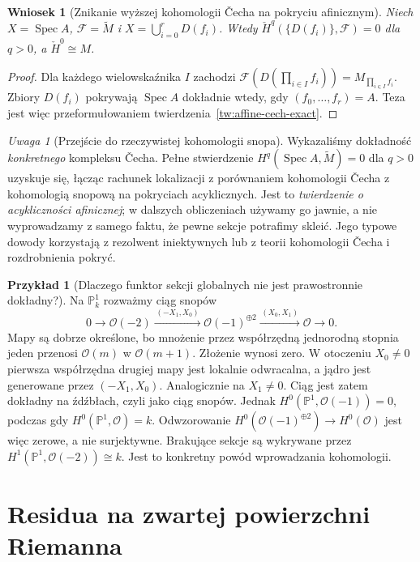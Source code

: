 \documentclass[11pt,a4paper,openany]{report}
\numberwithin{equation}{section}
\theoremstyle{plain}
\newtheorem{wniosek}[twierdzenie]{Wniosek}
\theoremstyle{definition}
\newtheorem{przyklad}[twierdzenie]{Przykład}
\theoremstyle{remark}
\newtheorem{uwaga}[twierdzenie]{Uwaga}
\newcommand{\PP}{\mathbb P}
\newcommand{\Spec}{\operatorname{Spec}}
\begin{document}
\begin{wniosek}[Znikanie wyższej kohomologii Čecha na pokryciu afinicznym]
Niech $X=\Spec A$, $\mathcal F=\widetilde M$ i
$X=\bigcup_{i=0}^rD(f_i)$. Wtedy
$\check H^q(\{D(f_i)\},\mathcal F)=0$ dla
$q>0$, a $\check H^0\cong M$.
\end{wniosek}
\begin{proof}
Dla każdego wielowskaźnika $I$ zachodzi
$\mathcal F(D(\prod_{i\in I}f_i))=M_{\prod_{i\in I}f_i}$.
Zbiory $D(f_i)$ pokrywają $\Spec A$ dokładnie wtedy,
gdy $(f_0,\ldots,f_r)=A$. Teza jest więc
przeformułowaniem twierdzenia~\ref{tw:affine-cech-exact}.
\end{proof}

\begin{uwaga}[Przejście do rzeczywistej kohomologii snopa]
Wykazaliśmy dokładność \emph{konkretnego} kompleksu
Čecha. Pełne stwierdzenie
$H^q(\Spec A,\widetilde M)=0$ dla $q>0$
uzyskuje się, łącząc rachunek lokalizacji z
porównaniem kohomologii Čecha z kohomologią
snopową na pokryciach acyklicznych. Jest to
\emph{twierdzenie o acykliczności afinicznej};
w dalszych obliczeniach używamy go jawnie,
a nie wyprowadzamy z samego faktu, że pewne sekcje
potrafimy skleić. Jego typowe dowody korzystają
z rezolwent iniektywnych lub z teorii kohomologii
Čecha i rozdrobnienia pokryć.
\end{uwaga}

\begin{przyklad}[Dlaczego funktor sekcji globalnych nie jest prawostronnie dokładny?]
Na $\PP^1_k$ rozważmy ciąg snopów
\[
0\longrightarrow\mathcal O(-2)
\xrightarrow{\,(-X_1,X_0)\,}\mathcal O(-1)^{\oplus2}
\xrightarrow{\,(X_0,X_1)\,}\mathcal O\longrightarrow0.
\]
Mapy są dobrze określone, bo mnożenie przez współrzędną
jednorodną stopnia jeden przenosi $\mathcal O(m)$ w
$\mathcal O(m+1)$. Złożenie wynosi zero.
W otoczeniu $X_0\ne0$ pierwsza współrzędna drugiej
mapy jest lokalnie odwracalna, a jądro jest generowane
przez $(-X_1,X_0)$. Analogicznie na $X_1\ne0$.
Ciąg jest zatem dokładny na źdźbłach, czyli jako
ciąg snopów. Jednak
$H^0(\PP^1,\mathcal O(-1))=0$, podczas gdy
$H^0(\PP^1,\mathcal O)=k$.
Odwzorowanie $H^0(\mathcal O(-1)^{\oplus2})\to
H^0(\mathcal O)$ jest więc zerowe, a nie surjektywne.
Brakujące sekcje są wykrywane przez
$H^1(\PP^1,\mathcal O(-2))\cong k$.
Jest to konkretny powód wprowadzania kohomologii.
\end{przyklad}

\section{Residua na zwartej powierzchni Riemanna}
\label{sec:residue-compact}
\end{document}
